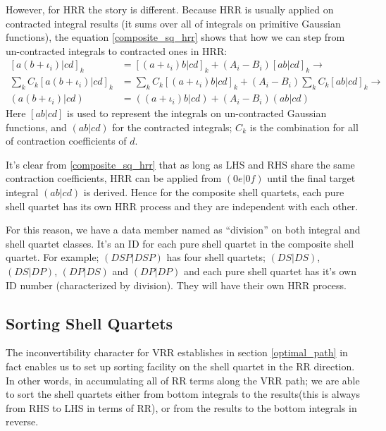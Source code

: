 However, for HRR the story is different. Because HRR is usually applied on
contracted integral results (it sums over all of integrals on 
primitive Gaussian functions), the equation \ref{composite_sq_hrr}
shows that how we can step from
un-contracted integrals to contracted ones in HRR:
\begin{align}\label{composite_sq_hrr}
 [a(b+\iota_{i})|cd]_{k} &= [(a+\iota_{i})b|cd]_{k} + 
(A_{i} - B_{i})[ab|cd]_{k} \rightarrow \nonumber \\
\sum_{k}C_{k}[a(b+\iota_{i})|cd]_{k} &= \sum_{k}C_{k}[(a+\iota_{i})b|cd]_{k} + 
(A_{i} - B_{i})\sum_{k}C_{k}[ab|cd]_{k} \rightarrow \nonumber \\
(a(b+\iota_{i})|cd) &= ((a+\iota_{i})b|cd) + 
(A_{i} - B_{i})(ab|cd)
\end{align}
Here $[ab|cd]$ is used to represent the integrals on un-contracted Gaussian 
functions, and $(ab|cd)$ for the contracted integrals; $C_{k}$ is the 
combination for all of contraction coefficients of $d$.

It's clear from \ref{composite_sq_hrr} that as long as LHS and RHS share the 
same contraction coefficients, HRR can be applied from $(0e|0f)$ until
the final target integral $(ab|cd)$ is derived. Hence for the composite 
shell quartets, each pure shell quartet has its own HRR process and they
are independent with each other.

For this reason, we have a data member named as ``division'' on both
integral and shell quartet classes. It's an ID for each pure shell quartet
in the composite shell quartet. For example; $(DSP|DSP)$ has four shell quartets;
$(DS|DS)$, $(DS|DP)$, $(DP|DS)$ and $(DP|DP)$ and each pure shell quartet has it's 
own ID number (characterized by division). They will have their own
HRR process.

\subsection{Sorting Shell Quartets}
%
%
\label{sort_shell_quartet}

The inconvertibility character for VRR establishes in section 
\ref{optimal_path} in fact enables us to set up sorting facility
on the shell quartet in the RR direction. In other words, in 
accumulating all of RR terms along the VRR path; we are able 
to sort the shell quartets either from bottom integrals to
the results(this is always from RHS to LHS in terms of RR),
or from the results to the bottom integrals in reverse.

